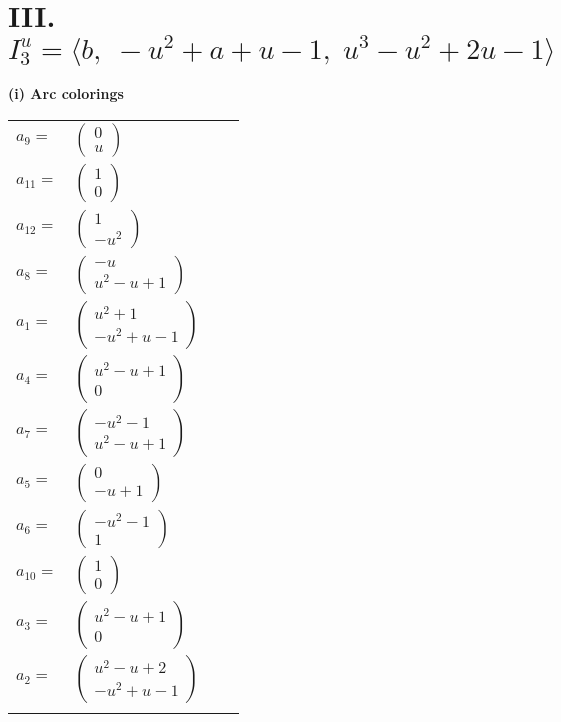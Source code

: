 \documentclass[1p]{elsarticle_modified}
\theoremstyle{definition}
\begin{document}
\centering \section*{III. $I^u_{3}= \langle b,\;- u^2+a+u-1,\;u^3- u^2+2 u-1 \rangle$}
\flushleft \textbf{(i) Arc colorings}\\
\begin{tabular}{m{7pt} m{180pt} m{7pt} m{180pt} }
\flushright $a_{9}=$&$\begin{pmatrix}0\\u\end{pmatrix}$ \\
\flushright $a_{11}=$&$\begin{pmatrix}1\\0\end{pmatrix}$ \\
\flushright $a_{12}=$&$\begin{pmatrix}1\\- u^2\end{pmatrix}$ \\
\flushright $a_{8}=$&$\begin{pmatrix}- u\\u^2- u+1\end{pmatrix}$ \\
\flushright $a_{1}=$&$\begin{pmatrix}u^2+1\\- u^2+u-1\end{pmatrix}$ \\
\flushright $a_{4}=$&$\begin{pmatrix}u^2- u+1\\0\end{pmatrix}$ \\
\flushright $a_{7}=$&$\begin{pmatrix}- u^2-1\\u^2- u+1\end{pmatrix}$ \\
\flushright $a_{5}=$&$\begin{pmatrix}0\\- u+1\end{pmatrix}$ \\
\flushright $a_{6}=$&$\begin{pmatrix}- u^2-1\\1\end{pmatrix}$ \\
\flushright $a_{10}=$&$\begin{pmatrix}1\\0\end{pmatrix}$ \\
\flushright $a_{3}=$&$\begin{pmatrix}u^2- u+1\\0\end{pmatrix}$ \\
\flushright $a_{2}=$&$\begin{pmatrix}u^2- u+2\\- u^2+u-1\end{pmatrix}$\\&\end{tabular}
\end{document}
